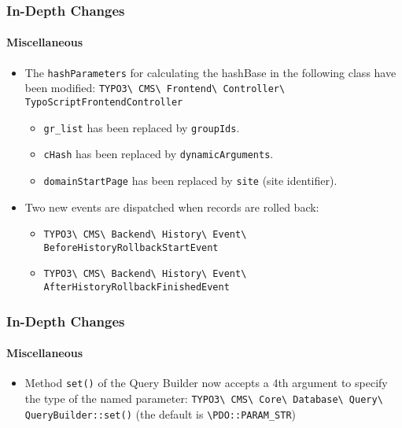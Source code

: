 \begin{frame}[fragile]
	\frametitle{In-Depth Changes}
	\framesubtitle{Miscellaneous}

	\begin{itemize}
		\item The \texttt{hashParameters} for calculating the hashBase in the following class have been modified:\newline
			\small
				\texttt{TYPO3\textbackslash
					CMS\textbackslash
					Frontend\textbackslash
					Controller\textbackslash
					TypoScriptFrontendController}
			\normalsize

			\begin{itemize}
				\item \texttt{gr\_list} has been replaced by \texttt{groupIds}.
				\item \texttt{cHash} has been replaced by \texttt{dynamicArguments}.
				\item \texttt{domainStartPage} has been replaced by \texttt{site} (site identifier).
			\end{itemize}

		\item Two new events are dispatched when records are rolled back:

			\begin{itemize}\smaller
				\item \texttt{TYPO3\textbackslash
					CMS\textbackslash
					Backend\textbackslash
					History\textbackslash
					Event\textbackslash
					BeforeHistoryRollbackStartEvent}
				\item \texttt{TYPO3\textbackslash
					CMS\textbackslash
					Backend\textbackslash
					History\textbackslash
					Event\textbackslash
					AfterHistoryRollbackFinishedEvent}
			\end{itemize}\normalsize

	\end{itemize}

\end{frame}


\begin{frame}[fragile]
	\frametitle{In-Depth Changes}
	\framesubtitle{Miscellaneous}

	\begin{itemize}
		\item Method \texttt{set()} of the Query Builder now accepts a 4th argument
			to specify the type of the named parameter:\newline
			\small
				\texttt{TYPO3\textbackslash
					CMS\textbackslash
					Core\textbackslash
					Database\textbackslash
					Query\textbackslash
					QueryBuilder::set()}
			\normalsize\newline
			\vspace{0.2cm}
			(the default is \texttt{\textbackslash PDO::PARAM\_STR})

	\end{itemize}

\end{frame}

